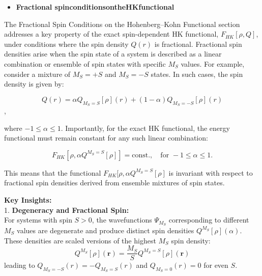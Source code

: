 \documentclass[%
 preprint, linenumbers,
 amsmath,amssymb,
 aps, physrev,
]{revtex4-2}
\begin{document}
\begin{itemize}
    \item \textbf{ Fractional spinconditionsontheHKfunctional
}
\end{itemize}

The Fractional Spin Conditions on the Hohenberg–Kohn Functional section addresses a key property of the exact spin-dependent HK functional, \( F_{HK}[\rho, Q] \), under conditions where the spin density \( Q(r) \) is fractional. Fractional spin densities arise when the spin state of a system is described as a linear combination or ensemble of spin states with specific \( M_S \) values. For example, consider a mixture of \( M_S = +S \) and \( M_S = -S \) states. In such cases, the spin density is given by:


\begin{equation}
    Q(r) = \alpha Q_{M_S=S}[\rho](r) + (1 - \alpha) Q_{M_S=-S}[\rho](r)
\end{equation},


where \( -1 \leq \alpha \leq 1 \). Importantly, for the exact HK functional, the energy functional must remain constant for any such linear combination:

\begin{equation}
    F_{HK}[\rho, \alpha Q^{M_S=S}[\rho]] = \text{const.}, \quad \text{for } -1 \leq \alpha \leq 1.
\end{equation}

This means that the functional \( F_{HK}[\rho, \alpha Q^{M_S=S}[\rho]\) is invariant with respect to fractional spin densities derived from ensemble mixtures of spin states.

\textbf{Key Insights:}\\
1.\textbf{ Degeneracy and Fractional Spin:}\\
 For systems with spin \( S > 0 \), the wavefunctions \( \Psi_{M_S} \) corresponding to different \( M_S \) values are degenerate and produce distinct spin densities \( Q^{M_S}[\rho](\alpha) \). These densities are scaled versions of the highest \( M_S \) spin density:
   \begin{equation}
        Q^{M_S}[\rho](\mathbf{r}) = \frac{M_S}{S} Q^{M_S=S}[\rho](\mathbf{r})
   \end{equation}
     leading to \( Q_{M_S=-S}(r) = -Q_{M_S=S}(r) \) and \( Q_{M_S=0}(r) = 0 \) for even \( S \).\\
    
\end{document}
